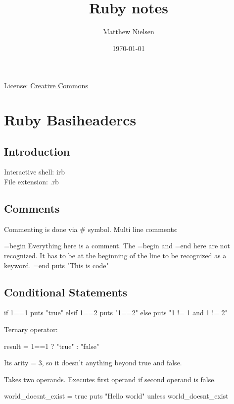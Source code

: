 \documentclass[11pt]{article}
\author{Matthew Nielsen}
\title{Ruby notes}
\date{\today}
\newcommand{\snippet}[1]{\colorbox{lightgray!40}{#1}}
\newcommand{\sectionkeyword}[1]{ \vspace{3mm} \centerline{\colorbox{black}{\color{white}{\textbf{{\large #1}}}}} \vspace{3mm} }
\begin{document}
\maketitle
\begin{center}
License: \href{https://creativecommons.org/licenses/by/4.0/}{Creative Commons}
\end{center}
\tableofcontents

\section{Ruby Basiheadercs}
\subsection{Introduction}
Interactive shell: \snippet{irb} \\
File extension: \snippet{.rb}

\subsection{Comments}
Commenting is done via \snippet{\#} symbol.
Multi line comments: \\
\begin{rubycode}
=begin
Everything here is a comment.
The =begin and =end here are not recognized.
It has to be at the beginning of the line to be recognized as a keyword.
=end
puts "This is code"
\end{rubycode}


\subsection{Conditional Statements}

\sectionkeyword{if}
\begin{rubycode}
if 1==1
  puts "true"
elsif 1==2
  puts "1==2"
else
  puts "1 != 1 and 1 != 2"    
\end{rubycode}

Ternary operator: \\
\begin{rubycode}
result = 1==1 ? "true" : "false"
\end{rubycode}


Its arity = 3, so it doesn't anything beyond true and false.

\sectionkeyword{unless}
Takes two operands. Executes first operand if second operand is false. \\
\begin{rubycode}
world_doesnt_exist = true
puts "Hello world" unless world_doesnt_exist
\end{rubycode}
\end{document}
